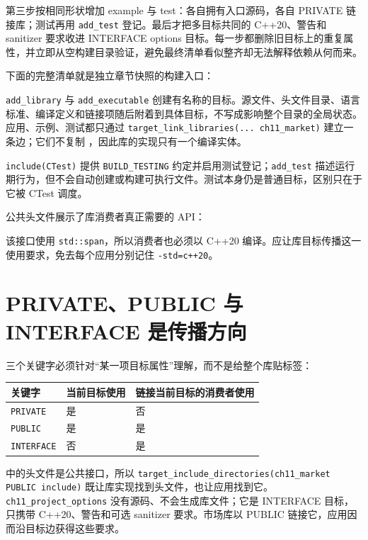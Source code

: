 第三步按相同形状增加 example 与 test：各自拥有入口源码，各自 PRIVATE 链接库；测试再用 \texttt{add\_test} 登记。最后才把多目标共同的 C++20、警告和 sanitizer 要求收进 INTERFACE options 目标。每一步都删除旧目标上的重复属性，并立即从空构建目录验证，避免最终清单看似整齐却无法解释依赖从何而来。

下面的完整清单就是独立章节快照的构建入口：



\texttt{add\_library} 与 \texttt{add\_executable} 创建有名称的目标。源文件、头文件目录、语言标准、编译定义和链接项随后附着到具体目标，不写成影响整个目录的全局状态。应用、示例、测试都只通过 \texttt{target\_link\_libraries(... ch11\_market)} 建立一条边；它们不复制 ，因此库的实现只有一个编译实体。

\texttt{include(CTest)} 提供 \texttt{BUILD\_TESTING} 约定并启用测试登记；\texttt{add\_test} 描述运行期行为，但不会自动创建或构建可执行文件。测试本身仍是普通目标，区别只在于它被 CTest 调度。

公共头文件展示了库消费者真正需要的 API：



该接口使用 \texttt{std::span}，所以消费者也必须以 C++20 编译。应让库目标传播这一使用要求，免去每个应用分别记住 \texttt{-std=c++20}。

\section{PRIVATE、PUBLIC 与 INTERFACE 是传播方向}

三个关键字必须针对“某一项目标属性”理解，而不是给整个库贴标签：

\begin{center}
\begin{tabular}{lll}
\toprule
关键字 & 当前目标使用 & 链接当前目标的消费者使用 \\
\midrule
\texttt{PRIVATE} & 是 & 否 \\
\texttt{PUBLIC} & 是 & 是 \\
\texttt{INTERFACE} & 否 & 是 \\
\bottomrule
\end{tabular}
\end{center}

 中的头文件是公共接口，所以 \texttt{target\_include\_directories(ch11\_market PUBLIC include)} 既让库实现找到头文件，也让应用找到它。\texttt{ch11\_project\_options} 没有源码、不会生成库文件；它是 INTERFACE 目标，只携带 C++20、警告和可选 sanitizer 要求。市场库以 PUBLIC 链接它，应用因而沿目标边获得这些要求。

